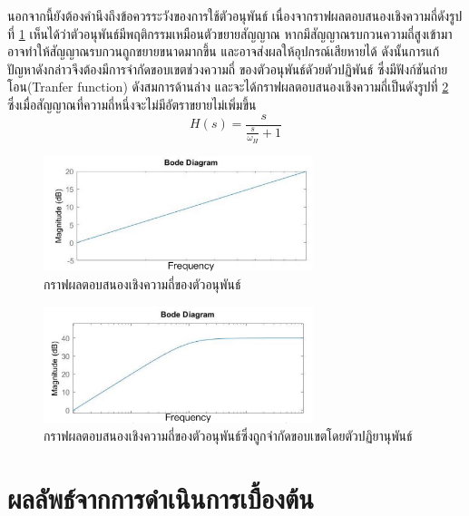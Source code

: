\documentclass[11pt,a4paper]{article}
\begin{document}
นอกจากนี้ยังต้องคำนึงถึงข้อควรระวังของการใช้ตัวอนุพันธ์ เนื่องจากราฟผลตอบสนองเชิงความถี่ดังรูปที่ \ref{bode_1} เห็นได้ว่าตัวอนุพันธ์มีพฤติกรรมเหมือนตัวขยายสัญญาณ
หากมีสัญญาณรบกวนความถี่สูงเข้ามา อาจทำให้สัญญาณรบกวนถูกขยายขนาดมากขึ้น และอาจส่งผลให้อุปกรณ์เสียหายได้ ดังนั้นการแก้ปัญหาดังกล่าวจึงต้องมีการจำกัดขอบเขตช่วงความถี่
ของตัวอนุพันธ์ดัวยตัวปฏิพันธ์ ซึ่งมีฟังก์ชันถ่ายโอน(Tranfer function) ดังสมการด้านล่าง และจะได้กราฟผลตอบสนองเชิงความถี่เป็นดังรูปที่ \ref{bode_2} ซึ่งเมื่อสัญญาณที่ความถี่หนึ่งจะไม่มีอัตราขยายไม่เพิ่มขึ้น
\begin{equation}\label{bode1}
    H(s)  = \frac{ s }{ \frac{s}{\omega_{H}} + 1 }
\end{equation}
\begin{figure}[h!]
    \begin{center}
        \includegraphics[width=0.7\textwidth]{bode_1n.jpg}
    \end{center}
    \caption{กราฟผลตอบสนองเชิงความถี่ของตัวอนุพันธ์}
    \label{bode_1}
\end{figure}
\begin{figure}[h!]
    \begin{center}
        \includegraphics[width=0.7\textwidth]{bode_2n.jpg}
    \end{center}
    \caption{กราฟผลตอบสนองเชิงความถี่ของตัวอนุพันธ์ซึ่งถูกจำกัดขอบเขตโดยตัวปฏิยานุพันธ์}
    \label{bode_2}
\end{figure}








\newpage

\section{ผลลัพธ์จากการดำเนินการเบื้องต้น}
\end{document}
